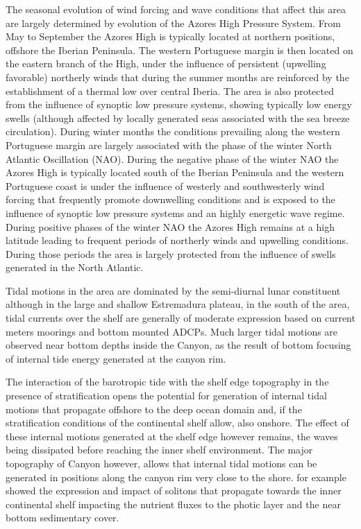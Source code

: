 The seasonal evolution of wind forcing and wave conditions that affect
this area are largely determined by evolution of the Azores High
Pressure System. From May to September the Azores High is typically
located at northern positions, offshore the Iberian Peninsula. The
western Portuguese margin is then located on the eastern branch of the
High, under the influence of persistent (upwelling favorable)
northerly winds that during the summer months are reinforced by the
establishment of a thermal low over central Iberia. The area is also
protected from the influence of synoptic low pressure systems, showing
typically low energy swells (although affected by locally generated
seas associated with the sea breeze circulation). During winter months
the conditions prevailing along the western Portuguese margin are
largely associated with the phase of the winter North Atlantic
Oscillation (NAO). During the negative phase of the winter NAO the
Azores High is typically located south of the Iberian Peninsula and
the western Portuguese coast is under the influence of westerly and
southwesterly wind forcing that frequently promote downwelling
conditions and is exposed to the influence of synoptic low pressure
systems and an highly energetic wave regime. During positive phases of
the winter NAO the Azores High remains at a high latitude leading to
frequent periods of northerly winds and upwelling conditions. During
those periods the area is largely protected from the influence of
swells generated in the North Atlantic.
 
Tidal motions in the area are dominated by the semi-diurnal lunar
constituent although in the large and shallow Estremadura plateau, in
the south of the area, tidal currents over the shelf are generally of
moderate expression  based on current meters
moorings and bottom mounted ADCPs.  Much larger tidal motions are
observed near bottom depths inside the \naz Canyon, as the result
of bottom focusing of internal tide energy generated at the canyon
rim. 
 
The interaction of the barotropic tide with the shelf edge topography
in the presence of stratification opens the potential for generation
of internal tidal motions that propagate offshore to the deep ocean
domain and, if the stratification conditions of the continental shelf
allow, also onshore. The effect of these internal motions generated at
the shelf edge however remains, the waves being dissipated before
reaching the inner shelf environment. The major topography of \naz
Canyon however, allows that internal tidal motions can be generated in
positions along the canyon rim very close to the
shore. \cite{quaresma07} %
for example showed the expression and impact of solitons that
propagate towards the inner continental shelf impacting the nutrient
fluxes to the photic layer and the near bottom sedimentary cover.

